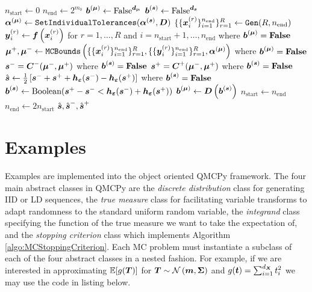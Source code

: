 \documentclass{article}[12pt]
\begin{document}
\begin{algorithm}[h!]
\begin{algorithmic}
    \State $n_\text{start} \gets 0$
    \State $n_\text{end} \gets 2^{m_0}$
    \State $\boldsymbol{b}^{(\boldsymbol{\mu})} \gets \text{False}^{\boldsymbol{d}_{\boldsymbol{\mu}}}$
    \State $\boldsymbol{b}^{(\boldsymbol{s})} \gets \text{False}^{\boldsymbol{d}_{\boldsymbol{s}}}$
    \State $\boldsymbol{\alpha}^{(\boldsymbol{\mu})} \gets \texttt{SetIndividualTolerances}(\boldsymbol{\alpha}^{(\boldsymbol{s})},\boldsymbol{D})$ 
        \State $\{\{\boldsymbol{x}_i^{(r)}\}_{i=1}^{n_\text{end}}\}_{r=1}^R \gets \texttt{Gen}(R,n_\text{end})$ \\ 
        \State $\boldsymbol{y}_i^{(r)} \gets \boldsymbol{f}\left(\boldsymbol{x}_i^{(r)}\right)$ for $r=1,\dots,R$ and $i=n_\text{start}+1,\dots,n_\text{end}$ where $\boldsymbol{b}^{(\boldsymbol{\mu})}=\textbf{\text{False}}$ \\ 
        \State $\boldsymbol{\mu}^+,\boldsymbol{\mu}^- \gets \texttt{MCBounds}\left(\{\{\boldsymbol{x}_i^{(r)}\}_{i=1}^{n_\text{end}}\}_{r=1}^R, \{\{\boldsymbol{y}_i^{(r)}\}_{i=1}^{n_\text{end}}\}_{r=1}^R,\boldsymbol{\alpha}^{(\boldsymbol{\mu})}\right)$ where $\boldsymbol{b}^{(\boldsymbol{\mu})}=\textbf{\text{False}}$ \\ 
        \State $\boldsymbol{s}^- = \boldsymbol{C}^-(\boldsymbol{\mu}^-,\boldsymbol{\mu}^+)$ where $\boldsymbol{b}^{(\boldsymbol{s})} = \textbf{\text{False}}$
        \State $\boldsymbol{s}^+ = \boldsymbol{C}^+(\boldsymbol{\mu}^-,\boldsymbol{\mu}^+)$ where $\boldsymbol{b}^{(\boldsymbol{s})} = \textbf{\text{False}}$
        \State $\hat{\boldsymbol{s}} \gets \frac{1}{2}\left[\boldsymbol{s}^-+\boldsymbol{s}^++\boldsymbol{h}_{\boldsymbol{\varepsilon}}(\boldsymbol{s}^-)-\boldsymbol{h}_{\boldsymbol{\varepsilon}}(\boldsymbol{s}^+)\right]$ where $\boldsymbol{b}^{(\boldsymbol{s})} = \textbf{\text{False}}$
        \State $\boldsymbol{b}^{(\boldsymbol{s})} \gets \text{Boolean}(\boldsymbol{s}^+-\boldsymbol{s}^- < \boldsymbol{h}_{\boldsymbol{\varepsilon}}(\boldsymbol{s}^-)+\boldsymbol{h}_{\boldsymbol{\varepsilon}}(\boldsymbol{s}^+))$
        \State $\boldsymbol{b}^{(\boldsymbol{\mu})} \gets \boldsymbol{D}\left(\boldsymbol{b}^{(\boldsymbol{s})}\right)$
        \State $n_\text{start} \gets n_\text{end}$
        \State $n_\text{end} \gets 2n_\text{start}$
    \EndWhile
    \State \Return $\hat{\boldsymbol{s}},\hat{\boldsymbol{s}}^-,\hat{\boldsymbol{s}}^+$
    \end{algorithmic}
\end{algorithm}

\section{Examples}

Examples are implemented into the object oriented QMCPy framework. The four main abstract classes in QMCPy are the \emph{discrete distribution} class for generating IID or LD sequences, the \emph{true measure} class for facilitating variable transforms to adapt randomness to the standard uniform random variable, the \emph{integrand} class specifying the function of the true measure we want to take the expectation of, and the \emph{stopping criterion} class which implements Algorithm \ref{algo:MCStoppingCriterion}. Each MC problem must instantiate a subclass of each of the four abstract classes in a nested fashion. For example, if we are interested in approximating $\mathbb{E}[g(\boldsymbol{T})]$ for $\boldsymbol{T} \sim \mathcal{N}\left(\boldsymbol{m},\boldsymbol{\Sigma}\right)$ and $g(\boldsymbol{t})=\sum_{i=1}^{d_{\boldsymbol{X}}} t_i^2$ we may use the code in listing  below.
\end{document}
